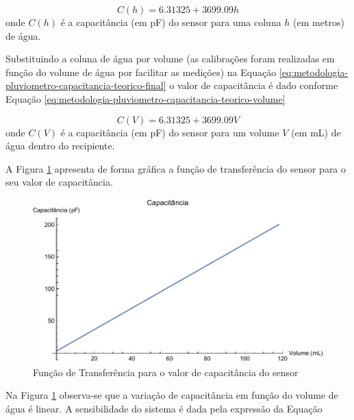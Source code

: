 \documentclass[a4paper]{instrumentacao}
\begin{document}
\begin{equation}
	C(h) = 6.31325 + 3699.09 h
	\label{eq:metodologia-pluviometro-capacitancia-teorico-final}
\end{equation}
\noindent onde $C(h)$ é a capacitância (em pF) do sensor para uma coluna $h$ (em metros) de água.

Substituindo a coluna de água por volume (as calibrações foram realizadas em função do volume de água por facilitar as medições) na Equação \ref{eq:metodologia-pluviometro-capacitancia-teorico-final} o valor de capacitância é dado conforme Equação \ref{eq:metodologia-pluviometro-capacitancia-teorico-volume}

\begin{equation}
	C(V) = 6.31325 + 3699.09 V
	\label{eq:metodologia-pluviometro-capacitancia-teorico-volume}
\end{equation}
\noindent onde $C(V)$ é a capacitância (em pF) do sensor para um volume $V$ (em mL) de água dentro do recipiente.

A Figura \ref{fig:metodologia-pluviometro-teorico-capacitancia} apresenta de forma gráfica a função de transferência do sensor para o seu valor de capacitância.

\begin{figure}[H]
	\centering
	\includegraphics[width=\textwidth]{Nivel/Teorico/Capacitancia.pdf}
	\caption{Função de Transferência para o valor de capacitância do sensor}
	\label{fig:metodologia-pluviometro-teorico-capacitancia}
\end{figure}

Na Figura \ref{fig:metodologia-pluviometro-teorico-capacitancia} observa-se que a variação de capacitância em função do volume de água é linear. A sensibilidade do sistema é dada pela expressão da Equação \label{eq:metodologia-pluviometro-teorico-capacitancia-sensibilidade}
\end{document}
